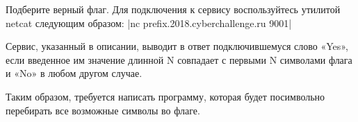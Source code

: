 
Подберите верный флаг. Для подключения к сервису воспользуйтесь утилитой netcat следующим образом:
|nc prefix.2018.cyberchallenge.ru 9001|

\solutionSection

Сервис, указанный в описании, выводит в ответ подключившемуся слово «Yes», если введенное им значение длинной N совпадает с первыми N символами флага и «No» в любом другом случае. 

Таким образом, требуется написать программу, которая будет посимвольно перебирать все возможные символы во флаге.



